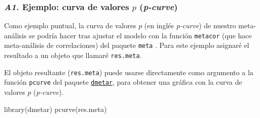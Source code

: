\documentclass[
  bookmarksnumbered]{article}
\newenvironment{Shaded}{\begin{snugshade}}{\end{snugshade}}
\newcommand{\AttributeTok}[1]{\textcolor[rgb]{0.00,0.34,0.68}{#1}}
\newcommand{\FunctionTok}[1]{\textcolor[rgb]{0.39,0.29,0.61}{#1}}
\newcommand{\NormalTok}[1]{\textcolor[rgb]{0.12,0.11,0.11}{#1}}
\newcommand{\OtherTok}[1]{\textcolor[rgb]{0.00,0.43,0.16}{#1}}
\newcommand{\SpecialCharTok}[1]{\textcolor[rgb]{0.24,0.68,0.91}{#1}}
\newcommand{\StringTok}[1]{\textcolor[rgb]{0.75,0.01,0.01}{#1}}
\begin{document}
\hypertarget{p-curve}{%
\subsubsection*{\texorpdfstring{\emph{A1.} Ejemplo: curva de valores \(p\) (\emph{p-curve})}{A1. Ejemplo: curva de valores p (p-curve)}}\label{p-curve}}

Como ejemplo puntual, la curva de valores \(p\) (en inglés \emph{p-curve}) de nuestro meta-análisis se podría hacer tras ajustar el modelo con la función \texttt{metacor} (que hace meta-análisis de correlaciones) del paquete \texttt{meta} \autocite{BalduzziMeta2019,schwarzerMetaAnalysis2015}. Para este ejemplo asignaré el resultado a un objeto que llamaré \texttt{res.meta}.

\begin{Shaded}
\end{Shaded}

El objeto resultante (\texttt{res.meta}) puede usarse directamente como argumento a la función \texttt{pcurve} del paquete \href{http://dmetar.protectlab.org/}{\texttt{dmetar}}, para obtener una gráfica con la curva de valores \(p\) (\emph{p-curve}).

\begin{Shaded}
\begin{Highlighting}[]
\FunctionTok{library}\NormalTok{(dmetar)}
\FunctionTok{pcurve}\NormalTok{(res.meta)}
\end{Highlighting}
\end{Shaded}
\end{document}
